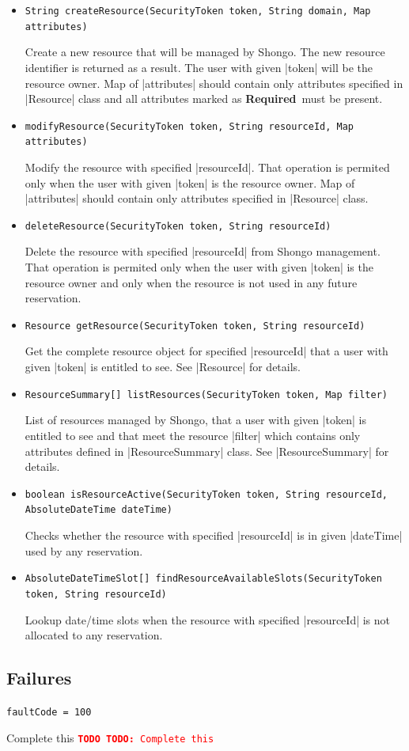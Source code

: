 \documentclass[a4paper]{report}
\newenvironment{Api}{\begin{itemize}}{\end{itemize}}
\newcommand{\ApiCode}[1]{\lstinline[style=styleApi]|#1|}
\newcommand{\ApiItem}[1]{\item #1 %

}
\newcommand{\ApiCmd}[1]{\ApiItem{\ApiCode{#1}}}
\newcommand{\ApiRequired}{{\color{blue!50!black}\textbf{Required}}}
\newenvironment{ApiFailures}{\begin{compactitem}}{\end{compactitem}}
\newcommand{\ApiFailure}[1]{\ApiItem{\ApiCode{faultCode = #1}}}
\newcommand{\TODO}[1]{%
\def\empty{}%
\def\prvniparametr{#1}%
\ifx\prvniparametr\empty%
\begingroup\tt\textcolor{red}{\noindent\textbf{TODO}}\endgroup
\else%
\begingroup\tt\textcolor{red}{\noindent\textbf{TODO:}\ #1}\endgroup
\fi%
}
\begin{document}
\begin{Api}

\ApiCmd{String createResource(SecurityToken token, String domain, Map attributes)}
Create a new resource that will be managed by Shongo. The new resource identifier is returned as a result. The user with given |token| will be the resource owner. Map of |attributes| should contain only attributes specified in |Resource| class and all attributes marked as \ApiRequired\ must be present.

\ApiCmd{modifyResource(SecurityToken token, String resourceId, Map attributes)}
Modify the resource with specified |resourceId|. That operation is permited only when the user with given |token| is the resource owner. Map of |attributes| should contain only attributes specified in |Resource| class.

\ApiCmd{deleteResource(SecurityToken token, String resourceId)}
Delete the resource with specified |resourceId| from Shongo management. That operation is permited only when the user with given |token| is the resource owner and only when the resource is not used in any future reservation.

\ApiCmd{Resource getResource(SecurityToken token, String resourceId)}
Get the complete resource object for specified |resourceId| that a user with given |token| is entitled to see. See |Resource| for details.

\ApiCmd{ResourceSummary[] listResources(SecurityToken token, Map filter)}
List of resources managed by Shongo, that a user with given |token| is entitled to see and that meet the resource |filter| which contains only attributes defined in |ResourceSummary| class. See |ResourceSummary| for details.

\ApiCmd{boolean isResourceActive(SecurityToken token, String resourceId, AbsoluteDateTime dateTime)}
Checks whether the resource with specified |resourceId| is in given |dateTime| used by any reservation.

\ApiCmd{AbsoluteDateTimeSlot[] findResourceAvailableSlots(SecurityToken token, String resourceId)}
Lookup date/time slots when the resource with specified |resourceId| is not allocated to any reservation.


\end{Api}

\subsection{Failures}

\begin{ApiFailures}
\ApiFailure{100}
\end{ApiFailures}
\TODO{Complete this}
\end{document}
